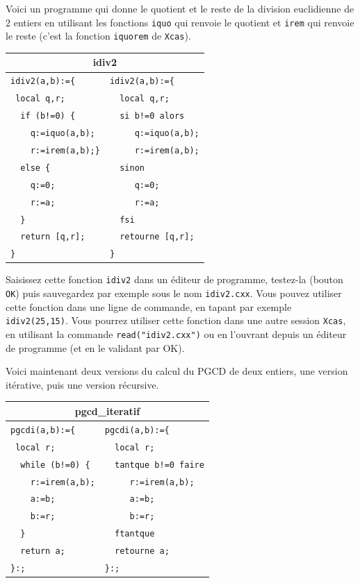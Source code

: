 \documentclass{article}
\begin{document}
Voici un programme qui donne le quotient et le 
reste de la division euclidienne de 2 entiers en utilisant les fonctions 
\verb|iquo| qui renvoie le quotient et \verb|irem| 
qui renvoie le reste (c'est la fonction \verb|iquorem| de {\tt Xcas}).

\begin{center}
\begin{tabular}{|l|l|}
\hline
\multicolumn{2}{|c|}{\bf idiv2}\\
\hline\hline
\verb+idiv2(a,b):={+ &\verb+idiv2(a,b):={+\\
\verb+ local q,r;+&\verb+  local q,r;+\\
\verb+  if (b!=0) {+&\verb+  si b!=0 alors+\\
\verb+    q:=iquo(a,b);+&\verb+     q:=iquo(a,b);+\\
\verb+    r:=irem(a,b);}+&\verb+     r:=irem(a,b);+\\
\verb+  else {+&\verb+  sinon+\\
\verb+    q:=0;+&\verb+     q:=0;+\\
\verb+    r:=a;+&\verb+     r:=a;+\\
\verb+  }+&\verb+  fsi+\\
\verb+  return [q,r];+&\verb+  retourne [q,r];+\\
\verb+}+&\verb+}+\\
 \hline
\end{tabular}
\end{center}
Saisissez cette fonction {\tt idiv2} dans un \'editeur de programme, testez-la
(bouton \verb|OK|) puis sauvegardez par exemple sous le nom
\verb|idiv2.cxx|. Vous pouvez utiliser cette fonction 
dans une ligne de commande, en tapant par exemple \verb|idiv2(25,15)|.
Vous pourrez utiliser cette fonction dans une autre session {\tt Xcas}, 
en utilisant la commande
\verb|read("idiv2.cxx")| ou en l'ouvrant depuis un
\'editeur de programme (et en le validant par OK).

Voici maintenant deux versions du calcul du PGCD de deux entiers, une
version it\'erative, puis une version r\'ecursive.

\begin{center}
\begin{tabular}{|l|l|}
\hline
\multicolumn{2}{|c|}{\bf pgcd\_iteratif}\\
\hline\hline
\verb+pgcdi(a,b):={+ &\verb+pgcdi(a,b):={+\\
\verb+ local r;+&\verb+  local r;+\\
\verb+  while (b!=0) {+&\verb+  tantque b!=0 faire+\\
\verb+    r:=irem(a,b);+&\verb+     r:=irem(a,b);+\\
\verb+    a:=b;+&\verb+     a:=b;+\\
\verb+    b:=r;+&\verb+     b:=r;+\\
\verb+  }+&\verb+  ftantque+\\
\verb+  return a;+&\verb+  retourne a;+\\
\verb+}:;+&\verb+}:;+\\
 \hline
\end{tabular}
\end{center}
\end{document}
